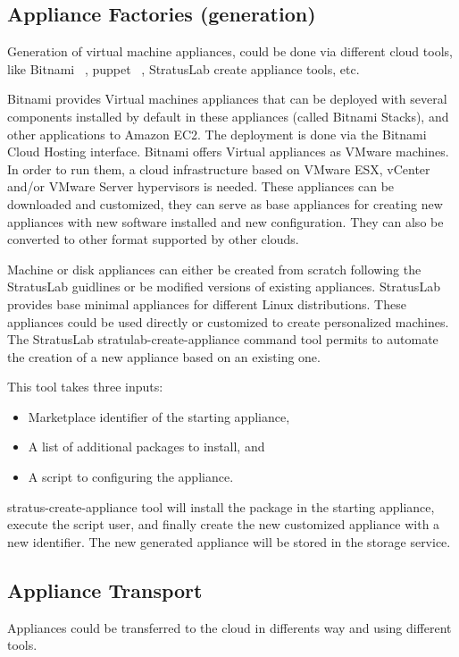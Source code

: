 \subsection{Appliance Factories (generation)}

Generation of virtual machine appliances, could be done via different
cloud tools, like Bitnami ~\cite{bitnami}, puppet ~\cite{puppet}, StratusLab create appliance tools,
etc.

Bitnami provides Virtual machines appliances that can be deployed with
several components installed by default in these appliances (called
Bitnami Stacks), and other applications to Amazon EC2. The deployment
is done via the Bitnami Cloud Hosting interface. Bitnami offers
Virtual appliances as VMware machines. In order to run them, a cloud
infrastructure based on VMware ESX, vCenter and/or VMware Server
hypervisors is needed. These appliances can be downloaded and
customized, they can serve as base appliances for creating new
appliances with new software installed and new configuration. They can
also be converted to other format supported by other clouds.

Machine or disk appliances can either be created from scratch
following the StratusLab guidlines or be modified versions of existing
appliances.  StratusLab provides base minimal appliances for different
Linux distributions. These appliances could be used directly or
customized to create personalized machines.  The StratusLab
stratulab-create-appliance command tool permits to automate the
creation of a new appliance based on an existing one.
 
This tool takes three inputs:
\begin{itemize}
\item Marketplace identifier of the starting appliance,
\item A list of additional packages to install, and
\item A script to configuring the appliance.
\end{itemize}
stratus-create-appliance tool will install the package in the starting
appliance, execute the script user, and finally create the new
customized appliance with a new identifier.  The new generated
appliance will be stored in the storage service.

\subsection{Appliance Transport}

Appliances could be transferred to the cloud in differents way and
using different tools.

